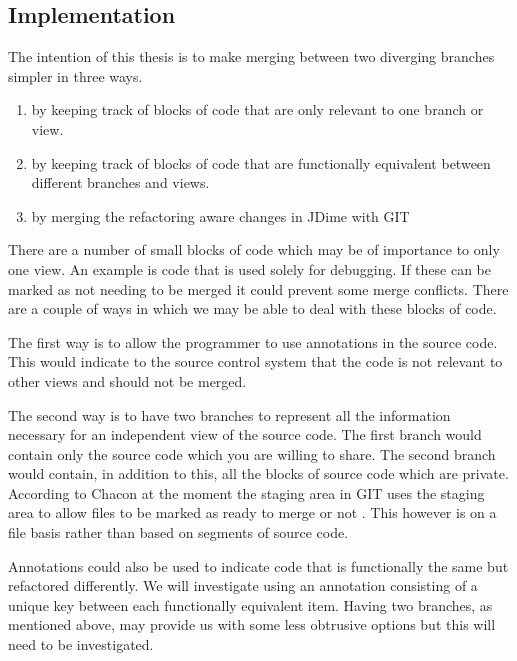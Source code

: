 \documentclass[12pt]{CRPITStyle}
\renewcommand{\cite}{\citep}
\begin{document}
\subsection{Implementation}

The intention of this thesis is to make merging between two diverging branches simpler in three ways. 

\begin{enumerate}

 \item by keeping track of blocks of code that are only relevant to one branch or view.
 \item by keeping track of blocks of code that are functionally equivalent between different branches and views.
 \item by merging the refactoring aware changes in JDime with GIT

\end{enumerate}

There are a number of small blocks of code which may be of importance to only one view.  An example is code that is used solely for debugging. If these can be marked as not needing to be merged it could prevent some merge conflicts. There are a couple of ways in which we may be able to deal with these blocks of code.

The first way is to allow the programmer to use annotations in the source code. This would indicate to the source control system that the code is not relevant to other views and should not be merged.

The second way is to have two branches to represent all the information necessary for an independent view of the source code.  The first branch would contain only the source code which you are willing to share. The second branch would contain, in addition to this, all the blocks of source code which are private.  According to Chacon at the moment the staging area in GIT uses the staging area to allow files to be marked as ready to merge or not \cite{Chacon2009}. This however is on a file basis rather than based on segments of source code.

Annotations could also be used to indicate code that is functionally the same but refactored differently. We will investigate using an annotation consisting of a unique key between each functionally equivalent item. Having two branches, as mentioned above, may provide us with some less obtrusive options but this will need to be investigated.
\end{document}

